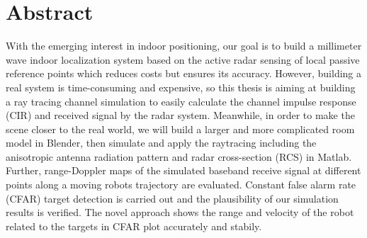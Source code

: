\documentclass[12pt,DIV14,BCOR12mm,a4paper,footinclude=false,headinclude,parskip=half-,twoside,openright,cleardoublepage=empty,toc=index,bibliography=totoc,listof=totoc]{scrreprt}
\title{\maintitle}%
\subtitle{\translatedtitle}
\author{
\large
  \ifthenelse{\equal{\doclang}{german}}{
  \begin{tabular}{rp{7cm}}
    \Large 
    Autor:      & \Large \student \vspace*{2mm}\\
    Ausgabe:    & \startdate \\
    Abgabe:     & \submission \vspace*{3mm}\\
    Betreuer:   & \tutor \vspace*{2mm}\\
    Stichworte: & \keywords
  \end{tabular}
  }{
  \begin{tabular}{rp{7cm}}
    \Large 
    Author:             & \Large \student \vspace*{2mm}\\
    Date of work begin: & \startdate \\
    Date of submission: & \submission \vspace*{3mm}\\
    Supervisor:         & \tutor \vspace*{2mm}\\
    Keywords:           & \keywords
  \end{tabular}
  }
  \bugfix
}
\date{}
\numberwithin{equation}{chapter}
\begin{document}
\maketitle
\cleardoublepage
{} %
\tableofcontents
\cleardoublepage
\renewcommand{\glossarypreamble}{\glsfindwidesttoplevelname[\currentglossary]}
\printunsrtglossary[type=abbreviations]
\cleardoublepage
\noindent
\begin{minipage}[t]{\textwidth}
    \chapter*{Abstract}
    With the emerging interest in indoor positioning, our goal is to build a millimeter wave indoor localization system based on the active radar sensing of local passive reference points which reduces costs but ensures its accuracy. However, building a real system is time-consuming and expensive, so this thesis is aiming at building a ray tracing channel simulation to easily calculate the channel impulse response (CIR) and received signal by the radar system. Meanwhile, in order to make the scene closer to the real world, we will build a larger and more complicated room model in Blender, then simulate and apply the raytracing including the anisotropic antenna radiation pattern and radar cross-section (RCS) in Matlab. Further, range-Doppler maps of the simulated baseband receive signal at different points along a moving robots trajectory are evaluated. Constant false alarm rate (CFAR) target detection is carried out and the plausibility of our simulation results is verified. The novel approach shows the range and velocity of the robot related to the targets in CFAR plot accurately and stabily.
\end{minipage}%
\hfill
\end{document}
